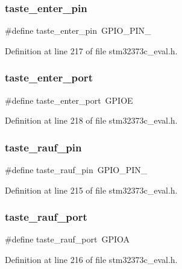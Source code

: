 \subsubsection{taste\+\_\+enter\+\_\+pin}
{\footnotesize\ttfamily \#define taste\+\_\+enter\+\_\+pin~G\+P\+I\+O\+\_\+\+P\+I\+N\+\_}



Definition at line 217 of file stm32373c\+\_\+eval.\+h.

\mbox{\label{group___l_e_d_ga2dcc4ef0ff92fa4410df74552051c14a}} 
\subsubsection{taste\+\_\+enter\+\_\+port}
{\footnotesize\ttfamily \#define taste\+\_\+enter\+\_\+port~G\+P\+I\+OE}



Definition at line 218 of file stm32373c\+\_\+eval.\+h.

\mbox{\label{group___l_e_d_ga1db5519cc9f68d4e3032fd1169bdce1a}} 
\subsubsection{taste\+\_\+rauf\+\_\+pin}
{\footnotesize\ttfamily \#define taste\+\_\+rauf\+\_\+pin~G\+P\+I\+O\+\_\+\+P\+I\+N\+\_}



Definition at line 215 of file stm32373c\+\_\+eval.\+h.

\mbox{\label{group___l_e_d_gadc5942a2b9a02e52a249be6d1deeb104}} 
\subsubsection{taste\+\_\+rauf\+\_\+port}
{\footnotesize\ttfamily \#define taste\+\_\+rauf\+\_\+port~G\+P\+I\+OA}



Definition at line 216 of file stm32373c\+\_\+eval.\+h.

\mbox{\label{group___l_e_d_gaa479b664aeef39d51fb6de68f2f2efb5}} 

